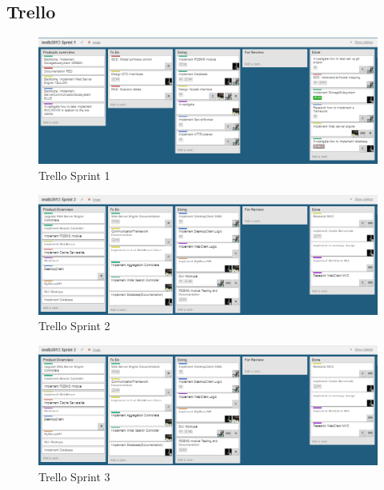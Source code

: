 \subsection{Trello}



\begin{figure}[h]
\includegraphics[scale=0.5]{img/SCRUM/trelloSprint1.png}
\caption{Trello Sprint 1}
\label{fig:Trello Sprint 1}
\end{figure}

\begin{figure}[h]
\includegraphics[scale=0.5]{img/SCRUM/trelloSprint2.png}
\caption{Trello Sprint 2}
\label{fig:Trello Sprint 2}
\end{figure}

\begin{figure}[h]
\includegraphics[scale=0.5]{img/SCRUM/trelloSprint2.png}
\caption{Trello Sprint 3}
\label{fig:Trello Sprint 3}
\end{figure}          
